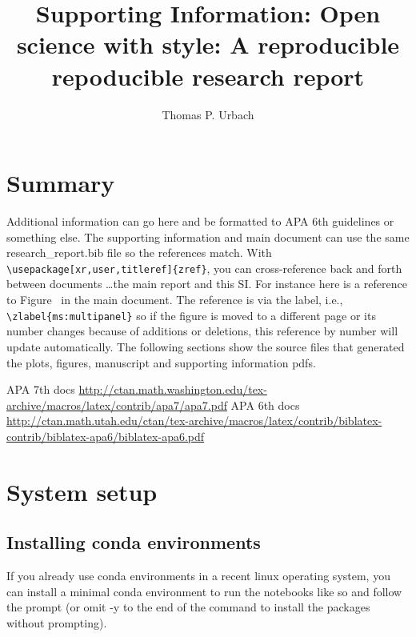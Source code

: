 \documentclass[helv,letter,doc,natbib,11pt]{apa6}  %
\title{Supporting Information: Open science with style: A reproducible repoducible research report}
\author{Thomas P. Urbach}
\affiliation{Kutas Lab \\ Cognitive Science Department \\ University of California, San Diego}
\begin{document}
\maketitle

\tableofcontents

\section{Summary}

Additional information can go here and be formatted to APA 6th
guidelines or something else. The supporting information and main
document can use the same research\_report.bib file so the references
match. With {\tt \textbackslash usepackage[xr,user,titleref]\{zref\}},
you can cross-reference back and forth between documents \ldots the
main report and this SI. For instance here is a reference to
Figure~ in the main document. The reference is via the
label, i.e., {\tt \textbackslash zlabel\{ms:multipanel\}} so if the figure
is moved to a different page or its number changes because of
additions or deletions, this reference by number will update
automatically. The following sections show the source files that
generated the plots, figures, manuscript and supporting information pdfs.


APA 7th docs \url{http://ctan.math.washington.edu/tex-archive/macros/latex/contrib/apa7/apa7.pdf}
APA 6th docs \url{http://ctan.math.utah.edu/ctan/tex-archive/macros/latex/contrib/biblatex-contrib/biblatex-apa6/biblatex-apa6.pdf}




% 
% 
% 
% 
% 



\section{System setup}

\subsection{Installing conda environments}

If you already use conda environments in a recent linux operating
system, you can install a minimal conda environment to run the
notebooks like so and follow the prompt (or omit -y to the end of the
command to install the packages without prompting).
\end{document}
